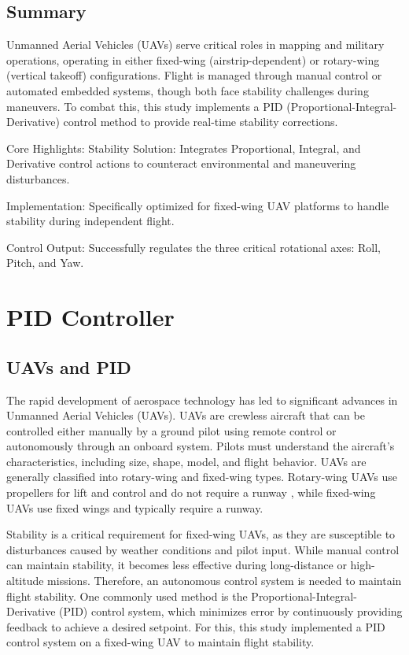 \documentclass[a4paper,12pt,oneside]{report}
\begin{document}
\section{Summary}
Unmanned Aerial Vehicles (UAVs) serve critical roles in mapping and military operations, operating in either fixed-wing (airstrip-dependent) or rotary-wing (vertical takeoff) configurations. Flight is managed through manual control or automated embedded systems, though both face stability challenges during maneuvers. To combat this, this study implements a PID (Proportional-Integral-Derivative) control method to provide real-time stability corrections.

Core Highlights:
Stability Solution: Integrates Proportional, Integral, and Derivative control actions to counteract environmental and maneuvering disturbances.

Implementation: Specifically optimized for fixed-wing UAV platforms to handle stability during independent flight.

Control Output: Successfully regulates the three critical rotational axes: Roll, Pitch, and Yaw.
\newpage


\chapter{PID Controller}
\label{chap:pid}
\section{UAVs and PID}
The rapid development of aerospace technology has led to significant advances in Unmanned Aerial Vehicles (UAVs). UAVs are crewless aircraft that can be controlled either manually by a ground pilot using remote control or autonomously through an onboard system. Pilots must understand the aircraft’s characteristics, including size, shape, model, and flight behavior. UAVs are generally classified into rotary-wing and fixed-wing types. Rotary-wing UAVs use propellers for lift and control and do not require a runway , while fixed-wing UAVs use fixed wings and typically require a runway.

Stability is a critical requirement for fixed-wing UAVs, as they are susceptible to disturbances caused by weather conditions and pilot input. While manual control can maintain stability, it becomes less effective during long-distance or high-altitude missions. Therefore, an autonomous control system is needed to maintain flight stability. One commonly used method is the Proportional-Integral-Derivative (PID) control system, which minimizes error by continuously providing feedback to achieve a desired setpoint. For this, this study implemented a PID control system on a fixed-wing UAV to maintain flight stability.
\end{document}

